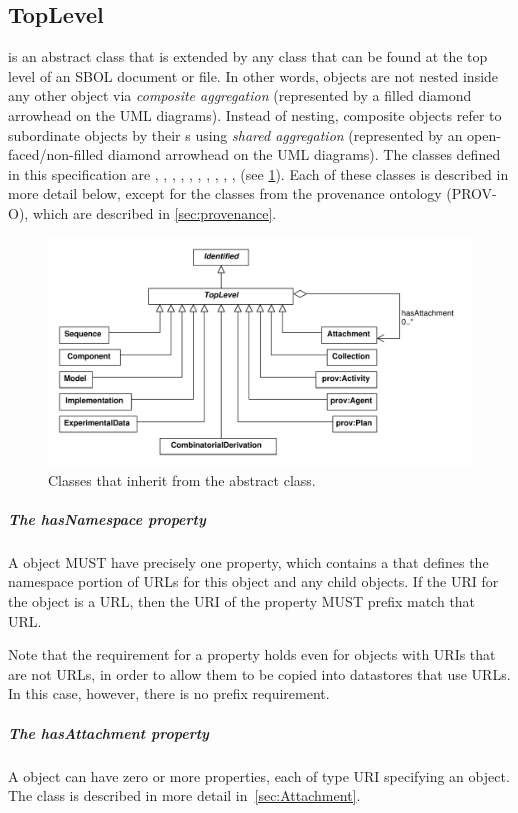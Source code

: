 \subsection {TopLevel}
\label{sec:TopLevel}
 is an abstract class that is extended by any  class that can be found at the top level of an SBOL document or file.
In other words,  objects are not nested inside any other object via \textit{composite aggregation} (represented by a filled diamond arrowhead on the UML diagrams).
Instead of nesting, composite  objects refer to subordinate  objects by their s using \textit{shared aggregation} (represented by an open-faced/non-filled diamond arrowhead on the UML diagrams).
The  classes defined in this specification are , , , , , , , , , ,  (see \ref{uml:toplevel}).
Each of these classes is described in more detail below, except for the classes from the provenance ontology (PROV-O), which are described in \ref{sec:provenance}.


\begin{figure}[ht]
\begin{center}
\includegraphics[width=\textwidth]{uml/toplevel}
\caption[]{Classes that inherit from the  abstract class.}
\label{uml:toplevel}
\end{center}
\end{figure}

\subparagraph{The hasNamespace property}
\label{sec:hasNamespace}
A  object MUST have precisely one  property, which contains a  that defines the namespace portion of URLs for this object and any child objects.
If the URI for the  object is a URL, then the URI of the  property MUST prefix match that URL.

Note that the requirement for a  property holds even for objects with URIs that are not URLs, in order to allow them to be copied into datastores that use URLs.  In this case, however, there is no prefix requirement.


\subparagraph{The hasAttachment property}
\label{sec:hasAttachment}
A  object can have zero or more  properties, each of type URI specifying an  object. The  class is described in more detail in~\ref{sec:Attachment}.
